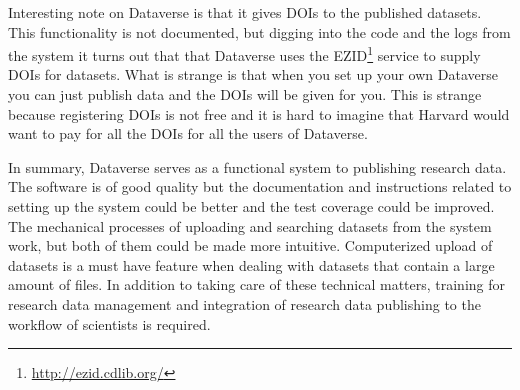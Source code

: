 Interesting note on Dataverse is that it gives DOIs to the published datasets.
This functionality is not documented, but digging into the code and the logs
from the system it turns out that that Dataverse uses the
EZID\footnote{\url{http://ezid.cdlib.org/}} service to supply DOIs for
datasets. What is strange is that when you set up your own Dataverse you
can just publish data and the DOIs will be given for you. This is strange
because registering DOIs is not free and it is hard to imagine that Harvard
would want to pay for all the DOIs for all the users of Dataverse.

In summary, Dataverse serves as a functional system to publishing research
data. The software is of good quality but the documentation and instructions
related to setting up the system could be better and the test coverage could be
improved. The mechanical processes of
uploading and searching datasets from the system work, but both of them could
be made more intuitive. Computerized upload of datasets is a must have feature
when dealing with datasets that contain a large amount of files. In addition to
taking care of these technical matters, training for research data management
and integration of research data publishing to the workflow of scientists is
required.

